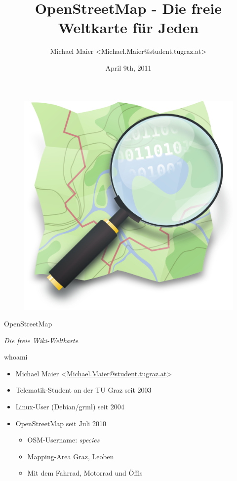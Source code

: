 \documentclass{beamer}
\title{OpenStreetMap - Die freie Weltkarte für Jeden}
\author{Michael Maier \textless Michael.Maier@student.tugraz.at\textgreater}
\date{April 9th, 2011}
\begin{document}

\begin{frame} 


\begin{figure}
  \centering
  \includegraphics[width=.5\textwidth]{mag_map.png}
\end{figure}

\begin{center}
\Huge{OpenStreetMap\\}
\end{center}

\begin{center}
\Large{\emph{Die freie Wiki-Weltkarte}}
\end{center}

\end{frame}



\begin{frame}{whoami}

  \begin{itemize}
    \item Michael Maier \textless \href{mailto:Michael.Maier@student.tugraz.at}{Michael.Maier@student.tugraz.at}\textgreater
    \item Telematik-Student an der TU Graz seit 2003
    \item Linux-User (Debian/grml) seit 2004
    \item OpenStreetMap seit Juli 2010
    \begin{itemize}
      \item OSM-Username: \emph{species}
      \item Mapping-Area Graz, Leoben
      \item Mit dem Fahrrad, Motorrad und Öffis
    \end{itemize}
  \end{itemize}
\end{frame}
\end{document}
